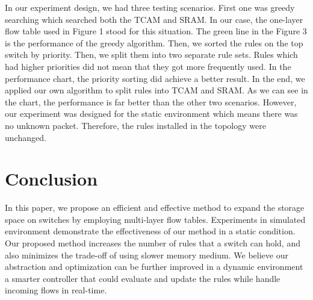 \documentclass[10pt,twocolumn,letterpaper]{article}
\begin{document}
In our experiment design, we had three testing scenarios. First one was greedy searching which searched both the TCAM and SRAM. In our case, the one-layer flow table used in Figure 1 stood for this situation. The green line in the Figure 3 is the performance of the greedy algorithm. Then, we sorted the rules on the top switch by priority. Then, we split them into two separate rule sets. Rules which had higher priorities did not mean that they got more frequently used. In the performance chart, the priority sorting did achieve a better result. In the end, we applied our own algorithm to split rules into TCAM and SRAM. As we can see in the chart, the performance is far better than the other two scenarios. However, our experiment was designed for the static environment which means there was no unknown packet. Therefore, the rules installed in the topology were unchanged.

\section{Conclusion} \label{sec:con}
In this paper, we propose an efficient and effective method to expand the storage space on switches by employing multi-layer flow tables. Experiments in simulated environment demonstrate the effectiveness of our method in a static condition. Our proposed method increases the number of rules that a switch can hold, and also minimizes the trade-off of using slower memory medium. We believe our abstraction and optimization can be further improved in a dynamic environment \textemdash a smarter controller that could evaluate and update the rules while handle incoming flows in real-time. 

{\small


}
\end{document}
